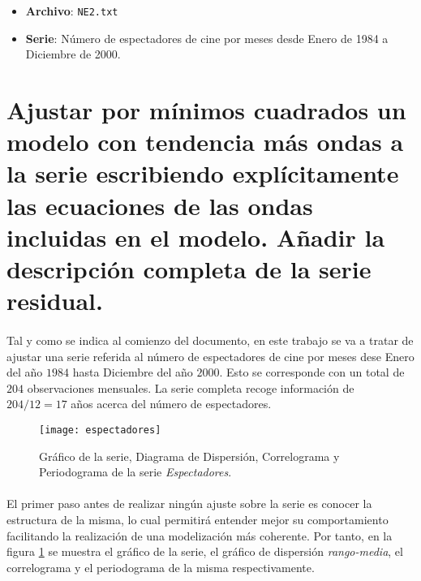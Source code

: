 \documentclass[a4paper, spanish]{article}
\begin{document}
  \maketitle

  \begin{itemize}
    \item \textbf{Archivo}: \texttt{NE2.txt}
    \item \textbf{Serie}: Número de espectadores de cine por meses desde Enero de 1984 a Diciembre de 2000.
  \end{itemize}

  \section{Ajustar por mínimos cuadrados un modelo con tendencia más ondas a la serie escribiendo explícitamente las ecuaciones de las ondas incluidas en el modelo. Añadir la descripción completa de la serie residual.}

    \paragraph{}
    Tal y como se indica al comienzo del documento, en este trabajo se va a tratar de ajustar una serie referida al número de espectadores de cine por meses dese Enero del año $1984$ hasta Diciembre del año $2000$. Esto se corresponde con un total de $204$ observaciones mensuales. La serie completa recoge información de $204 / 12 = 17$ años acerca del número de espectadores.

    \begin{figure}[h]
      \texttt{[image: espectadores]}
      \caption{Gráfico de la serie, Diagrama de Dispersión, Correlograma y Periodograma de la serie \emph{Espectadores}.}
      \label{fig:espectadores}
    \end{figure}

    \paragraph{}
    El primer paso antes de realizar ningún ajuste sobre la serie es conocer la estructura de la misma, lo cual permitirá entender mejor su comportamiento facilitando la realización de una modelización más coherente. Por tanto, en la figura \ref{fig:espectadores} se muestra el gráfico de la serie, el gráfico de dispersión \emph{rango-media}, el correlograma y el periodograma de la misma respectivamente.
\end{document}
